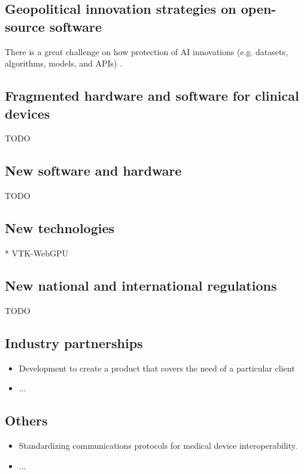 \documentclass{article}
\begin{document}
\subsection{Geopolitical innovation strategies on open-source software}
There is a great challenge on how protection of AI innovations (e.g. datasets, algorithms, models, and APIs) \cite{munozferrandis2022-open-sourcing-ai}.

\subsection{Fragmented hardware and software for clinical devices}
TODO

\subsection{New software and hardware}
TODO


\subsection{New technologies}
* VTK-WebGPU


\subsection{New national and international regulations}
TODO

\subsection{Industry partnerships}
\begin{itemize}
    \item Development to create a product that covers the need of a particular client
    \item ...
\end{itemize}


\subsection{Others}
\begin{itemize}
    \item Standardizing communications protocols for medical device interoperability. 
    \item ...
\end{itemize}
\end{document}
